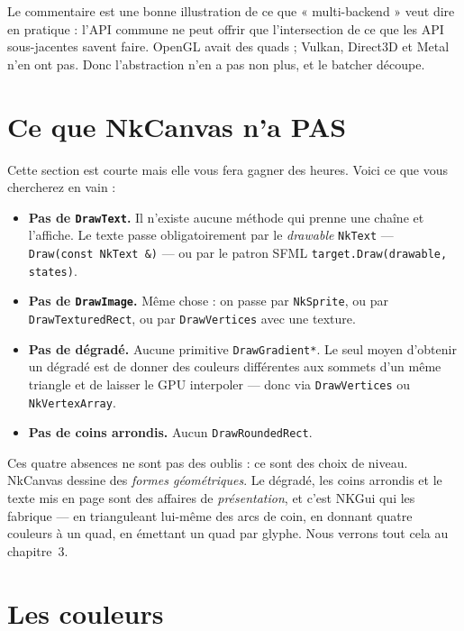 Le commentaire est une bonne illustration de ce que « multi-backend » veut dire
en pratique : l'API commune ne peut offrir que l'intersection de ce que les API
sous-jacentes savent faire. OpenGL avait des quads ; Vulkan, Direct3D et Metal
n'en ont pas. Donc l'abstraction n'en a pas non plus, et le batcher découpe.

\section{Ce que NkCanvas n'a PAS}

Cette section est courte mais elle vous fera gagner des heures. Voici ce que
vous chercherez en vain :

\begin{itemize}
  \item \textbf{Pas de \texttt{DrawText}.} Il n'existe aucune méthode qui prenne
        une chaîne et l'affiche. Le texte passe obligatoirement par le
        \emph{drawable} \texttt{NkText} — \texttt{Draw(const NkText \&)} — ou par
        le patron SFML \texttt{target.Draw(drawable, states)}.
  \item \textbf{Pas de \texttt{DrawImage}.} Même chose : on passe par
        \texttt{NkSprite}, ou par \texttt{DrawTexturedRect}, ou par
        \texttt{DrawVertices} avec une texture.
  \item \textbf{Pas de dégradé.} Aucune primitive \texttt{DrawGradient*}. Le seul
        moyen d'obtenir un dégradé est de donner des couleurs différentes aux
        sommets d'un même triangle et de laisser le GPU interpoler — donc via
        \texttt{DrawVertices} ou \texttt{NkVertexArray}.
  \item \textbf{Pas de coins arrondis.} Aucun \texttt{DrawRoundedRect}.
\end{itemize}

\begin{nkretenir}
Ces quatre absences ne sont pas des oublis : ce sont des choix de niveau.
NkCanvas dessine des \emph{formes géométriques}. Le dégradé, les coins arrondis
et le texte mis en page sont des affaires de \emph{présentation}, et c'est NKGui
qui les fabrique — en trianguleant lui-même des arcs de coin, en donnant quatre
couleurs à un quad, en émettant un quad par glyphe. Nous verrons tout cela au
chapitre~3.
\end{nkretenir}

\section{Les couleurs}

